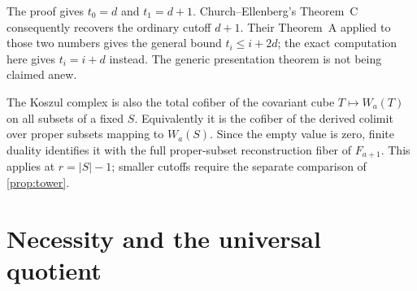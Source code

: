 \documentclass[11pt,a4paper]{article}
\theoremstyle{definition}
\theoremstyle{remark}
\begin{document}
The proof gives $t_0=d$ and $t_1=d+1$. Church--Ellenberg's Theorem~C consequently recovers the ordinary cutoff $d+1$. Their Theorem~A applied to those two numbers gives the general bound $t_i\le i+2d$; the exact computation here gives $t_i=i+d$ instead. The generic presentation theorem is not being claimed anew.

The Koszul complex is also the total cofiber of the covariant cube $T\mapsto W_a(T)$ on all subsets of a fixed $S$. Equivalently it is the cofiber of the derived colimit over proper subsets mapping to $W_a(S)$. Since the empty value is zero, finite duality identifies it with the full proper-subset reconstruction fiber of $F_{a+1}$. This applies at $r=|S|-1$; smaller cutoffs require the separate comparison of \cref{prop:tower}.

\section{Necessity and the universal quotient}\label{sec:universal}
\end{document}
